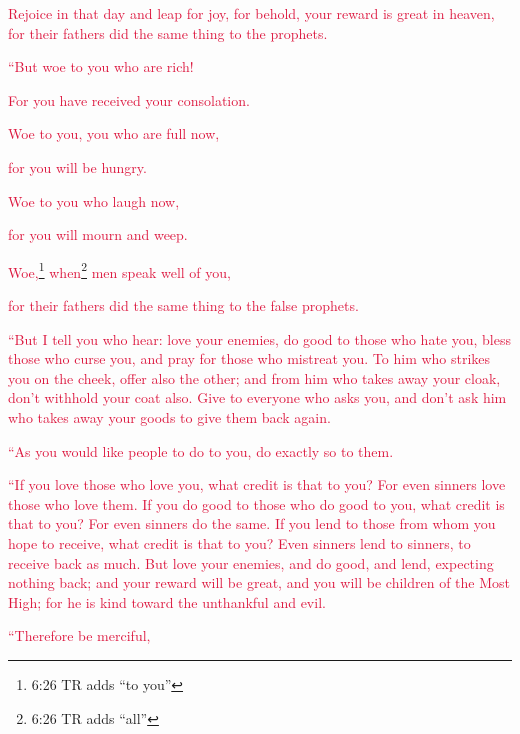 \myverse{}\textcolor{crimson}{Rejoice in that day and leap for joy, for behold,
	your reward is great in heaven, for their fathers did the same thing to the prophets.}


\vspace{\baselineskip} \myverse{}\textcolor{crimson}{“But woe to you who are rich!}

\textcolor{crimson}{For you have received your consolation.}

\myverse{}\textcolor{crimson}{Woe to you, you who are full now,}

\textcolor{crimson}{for you will be hungry.}

\textcolor{crimson}{Woe to you who laugh now,}

\textcolor{crimson}{for you will mourn and weep.}

\myverse{}\textcolor{crimson}{Woe,}\footnote{6:26 TR adds “to you”}
\textcolor{crimson}{when}\footnote{6:26 TR adds “all”
}
\textcolor{crimson}{men speak well of you,}

\textcolor{crimson}{for their fathers did the same thing to the false prophets.}

\myverse{}\textcolor{crimson}{“But I tell you who hear: love your enemies, do good to those
	who hate you,
}
\myverse{}\textcolor{crimson}{bless those who curse you, and pray for those who mistreat you.
}
\myverse{}\textcolor{crimson}{To him who strikes you on the cheek, offer also the other; and from him
	who takes away your cloak, don’t withhold your coat also.
}
\myverse{}\textcolor{crimson}{Give to everyone who asks you, and don’t ask him who takes away your goods
	to give them back again.}

\myverse{}\textcolor{crimson}{“As you would like people to do to you, do exactly so to
	them.
}

\myverse{}\textcolor{crimson}{“If you love those who love you, what credit is that to you?
	For even sinners love those who love them.
}
\myverse{}\textcolor{crimson}{If you do good to those who do good to you, what credit is that to you?
	For even sinners do the same.
}
\myverse{}\textcolor{crimson}{If you lend to those from whom you hope to receive, what credit is that
	to you? Even sinners lend to sinners, to receive back as much.
}
\myverse{}\textcolor{crimson}{But love your enemies, and do good, and lend, expecting nothing back;
	and your reward will be great, and you will be children of the Most High; for he is kind toward the unthankful
	and evil.}

\myverse{}\textcolor{crimson}{“Therefore be merciful,}


